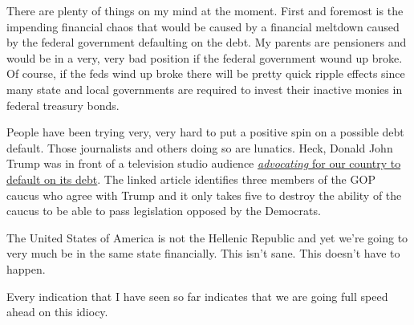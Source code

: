 There are plenty of things on my mind at the moment. First and foremost
is the impending financial chaos that would be caused by a financial
meltdown caused by the federal government defaulting on the debt. My
parents are pensioners and would be in a very, very bad position if the
federal government wound up broke. Of course, if the feds wind up broke
there will be pretty quick ripple effects since many state and local
governments are required to invest their inactive monies in federal
treasury bonds.

People have been trying very, very hard to put a positive spin on a
possible debt default. Those journalists and others doing so are
lunatics. Heck, Donald John Trump was in front of a television studio
audience
\href{https://web.archive.org/web/20230513041548/https://www.msn.com/en-us/news/politics/trump-call-for-debt-default-echoed-by-house-extremists/ar-AA1b7oNC}{\emph{advocating}
for our country to default on its debt}. The linked article identifies
three members of the GOP caucus who agree with Trump and it only takes
five to destroy the ability of the caucus to be able to pass legislation
opposed by the Democrats.

The United States of America is not the Hellenic Republic and yet we're
going to very much be in the same state financially. This isn't sane.
This doesn't have to happen.

Every indication that I have seen so far indicates that we are going
full speed ahead on this idiocy.
